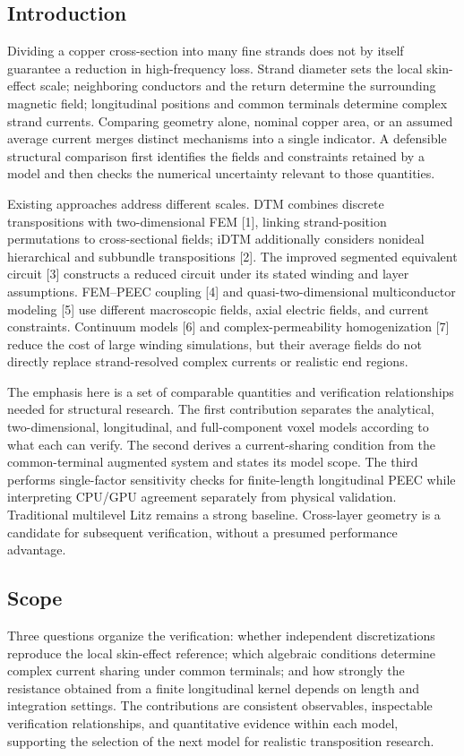 \documentclass[journal,10pt]{IEEEtran}
\begin{document}
\subsection*{Introduction}
\hypertarget{01.introduction.heading}{}
Dividing a copper cross-section into many fine strands does not by itself guarantee a reduction in high-frequency loss. Strand diameter sets the local skin-effect scale; neighboring conductors and the return determine the surrounding magnetic field; longitudinal positions and common terminals determine complex strand currents. Comparing geometry alone, nominal copper area, or an assumed average current merges distinct mechanisms into a single indicator. A defensible structural comparison first identifies the fields and constraints retained by a model and then checks the numerical uncertainty relevant to those quantities.


Existing approaches address different scales. DTM combines discrete transpositions with two-dimensional FEM [1], linking strand-position permutations to cross-sectional fields; iDTM additionally considers nonideal hierarchical and subbundle transpositions [2]. The improved segmented equivalent circuit [3] constructs a reduced circuit under its stated winding and layer assumptions. FEM–PEEC coupling [4] and quasi-two-dimensional multiconductor modeling [5] use different macroscopic fields, axial electric fields, and current constraints. Continuum models [6] and complex-permeability homogenization [7] reduce the cost of large winding simulations, but their average fields do not directly replace strand-resolved complex currents or realistic end regions.


The emphasis here is a set of comparable quantities and verification relationships needed for structural research. The first contribution separates the analytical, two-dimensional, longitudinal, and full-component voxel models according to what each can verify. The second derives a current-sharing condition from the common-terminal augmented system and states its model scope. The third performs single-factor sensitivity checks for finite-length longitudinal PEEC while interpreting CPU/GPU agreement separately from physical validation. Traditional multilevel Litz remains a strong baseline. Cross-layer geometry is a candidate for subsequent verification, without a presumed performance advantage.


\subsection*{Scope}
\hypertarget{01.scope.heading}{}
Three questions organize the verification: whether independent discretizations reproduce the local skin-effect reference; which algebraic conditions determine complex current sharing under common terminals; and how strongly the resistance obtained from a finite longitudinal kernel depends on length and integration settings. The contributions are consistent observables, inspectable verification relationships, and quantitative evidence within each model, supporting the selection of the next model for realistic transposition research.
\end{document}
